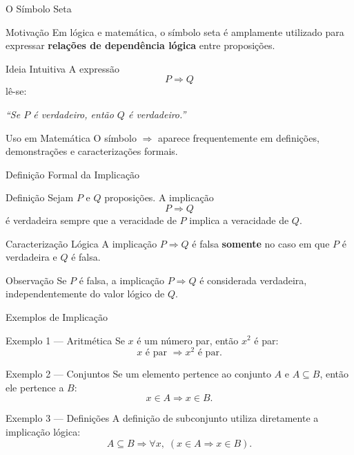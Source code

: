 \documentclass[9pt]{beamer}
\begin{document}
\begin{frame}{O Símbolo Seta}

\begin{block}{Motivação}
Em lógica e matemática, o símbolo seta é amplamente utilizado para expressar
\textbf{relações de dependência lógica} entre proposições.
\end{block}

\begin{block}{Ideia Intuitiva}
A expressão
\[
P \Rightarrow Q
\]
lê-se:
\begin{center}
\emph{``Se $P$ é verdadeiro, então $Q$ é verdadeiro.''}
\end{center}
\end{block}

\begin{block}{Uso em Matemática}
O símbolo $\Rightarrow$ aparece frequentemente em definições,
demonstrações e caracterizações formais.
\end{block}

\end{frame}
\begin{frame}{Definição Formal da Implicação}

\begin{block}{Definição}
Sejam $P$ e $Q$ proposições.
A implicação
\[
P \Rightarrow Q
\]
é verdadeira sempre que a veracidade de $P$ implica a veracidade de $Q$.
\end{block}

\begin{block}{Caracterização Lógica}
A implicação $P \Rightarrow Q$ é falsa \textbf{somente} no caso em que
$P$ é verdadeira e $Q$ é falsa.
\end{block}

\begin{block}{Observação}
Se $P$ é falsa, a implicação $P \Rightarrow Q$ é considerada verdadeira,
independentemente do valor lógico de $Q$.
\end{block}

\end{frame}
\begin{frame}{Exemplos de Implicação}

\begin{block}{Exemplo 1 — Aritmética}
Se $x$ é um número par, então $x^2$ é par:
\[
x \text{ é par } \Rightarrow x^2 \text{ é par}.
\]
\end{block}

\begin{block}{Exemplo 2 — Conjuntos}
Se um elemento pertence ao conjunto $A$ e $A \subseteq B$, então ele pertence a $B$:
\[
x \in A \Rightarrow x \in B.
\]
\end{block}

\begin{block}{Exemplo 3 — Definições}
A definição de subconjunto utiliza diretamente a implicação lógica:
\[
A \subseteq B \Rightarrow \forall x,\; (x \in A \Rightarrow x \in B).
\]
\end{block}

\end{frame}
\end{document}
